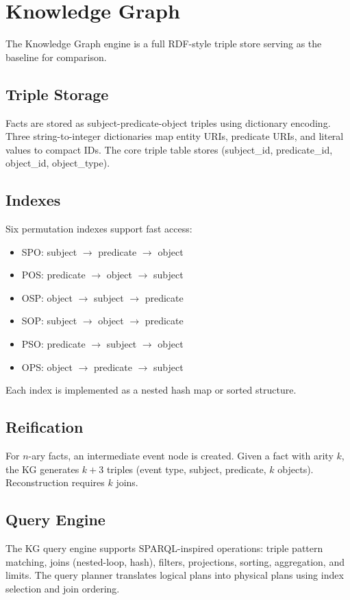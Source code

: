 \section{Knowledge Graph}
\label{sec:knowledge-graph}

The Knowledge Graph engine is a full RDF-style triple store serving as
the baseline for comparison.

\subsection{Triple Storage}
\label{sec:kg:storage}

Facts are stored as subject-predicate-object triples using dictionary
encoding. Three string-to-integer dictionaries map entity URIs, predicate
URIs, and literal values to compact IDs. The core triple table stores
(subject\_id, predicate\_id, object\_id, object\_type).

\subsection{Indexes}
\label{sec:kg:indexes}

Six permutation indexes support fast access:
\begin{itemize}
    \item SPO: subject $\to$ predicate $\to$ object
    \item POS: predicate $\to$ object $\to$ subject
    \item OSP: object $\to$ subject $\to$ predicate
    \item SOP: subject $\to$ object $\to$ predicate
    \item PSO: predicate $\to$ subject $\to$ object
    \item OPS: object $\to$ predicate $\to$ subject
\end{itemize}
Each index is implemented as a nested hash map or sorted structure.

\subsection{Reification}
\label{sec:kg:reification}

For $n$-ary facts, an intermediate event node is created. Given a fact
with arity $k$, the KG generates $k + 3$ triples (event type, subject,
predicate, $k$ objects). Reconstruction requires $k$ joins.

\subsection{Query Engine}
\label{sec:kg:query}

The KG query engine supports SPARQL-inspired operations: triple pattern
matching, joins (nested-loop, hash), filters, projections, sorting,
aggregation, and limits. The query planner translates logical plans into
physical plans using index selection and join ordering.
